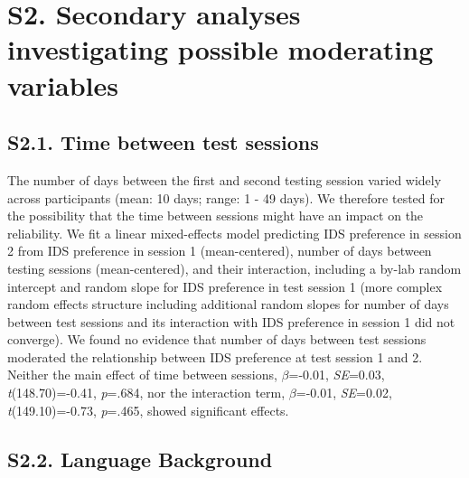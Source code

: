 \documentclass[
  man, donotrepeattitle,floatsintext]{apa6}
\begin{document}
\newpage

\hypertarget{s2.-secondary-analyses-investigating-possible-moderating-variables}{%
\section{S2. Secondary analyses investigating possible moderating variables}\label{s2.-secondary-analyses-investigating-possible-moderating-variables}}

\hypertarget{s2.1.-time-between-test-sessions}{%
\subsection{S2.1. Time between test sessions}\label{s2.1.-time-between-test-sessions}}

The number of days between the first and second testing session varied widely across participants (mean: 10 days; range: 1 - 49 days). We therefore tested for the possibility that the time between sessions might have an impact on the reliability. We fit a linear mixed-effects model predicting IDS preference in session 2 from IDS preference in session 1 (mean-centered), number of days between testing sessions (mean-centered), and their interaction, including a by-lab random intercept and random slope for IDS preference in test session 1 (more complex random effects structure including additional random slopes for number of days between test sessions and its interaction with IDS preference in session 1 did not converge). We found no evidence that number of days between test sessions moderated the relationship between IDS preference at test session 1 and 2. Neither the main effect of time between sessions, \(\beta\)=-0.01, \emph{SE}=0.03, \emph{t}(148.70)=-0.41, \emph{p}=.684, nor the interaction term, \(\beta\)=-0.01, \emph{SE}=0.02, \emph{t}(149.10)=-0.73, \emph{p}=.465, showed significant effects.

\hypertarget{s2.2.-language-background}{%
\subsection{S2.2. Language Background}\label{s2.2.-language-background}}
\end{document}

